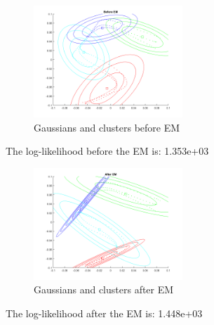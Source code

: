 \documentclass[conference]{IEEEtran}
\begin{document}
\begin{figure}[h!]
  	\centering
    \includegraphics[width=0.5\textwidth]{img/1before_em.png}
    \caption{Gaussians and clusters before EM}
    \label{fig:before_em}
\end{figure}
The log-likelihood before the EM is: 1.353e+03

\begin{figure}[h!]
  	\centering
    \includegraphics[width=0.5\textwidth]{img/1after_em.png}
    \caption{Gaussians and clusters after EM}
    \label{fig:after_em}
\end{figure}

The log-likelihood after the EM is: 1.448e+03
\newpage
~
\newpage
\end{document}
